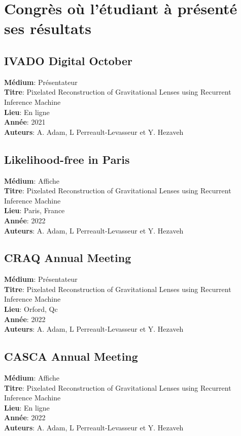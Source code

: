 \chapter{Congrès où l'étudiant à présenté ses résultats}

\section*{IVADO Digital October}
\textbf{Médium}: Présentateur \\
\textbf{Titre}: Pixelated Reconstruction of Gravitational Lenses using Recurrent Inference Machine \\
\textbf{Lieu}: En ligne\\
\textbf{Année}: 2021\\
\textbf{Auteurs}: A. Adam, L Perreault-Levasseur et Y. Hezaveh


\section*{Likelihood-free in Paris}
\textbf{Médium}: Affiche\\
\textbf{Titre}: Pixelated Reconstruction of Gravitational Lenses using Recurrent Inference Machine \\
\textbf{Lieu}: Paris, France\\
\textbf{Année}: 2022\\
\textbf{Auteurs}: A. Adam, L Perreault-Levasseur et Y. Hezaveh

\section*{CRAQ Annual Meeting}
\textbf{Médium}: Présentateur\\
\textbf{Titre}: Pixelated Reconstruction of Gravitational Lenses using Recurrent Inference Machine \\
\textbf{Lieu}: Orford, Qc\\
\textbf{Année}: 2022\\
\textbf{Auteurs}: A. Adam, L Perreault-Levasseur et Y. Hezaveh

\section*{CASCA Annual Meeting}
\textbf{Médium}: Affiche\\
\textbf{Titre}: Pixelated Reconstruction of Gravitational Lenses using Recurrent Inference Machine \\
\textbf{Lieu}: En ligne\\
\textbf{Année}: 2022\\
\textbf{Auteurs}: A. Adam, L Perreault-Levasseur et Y. Hezaveh

